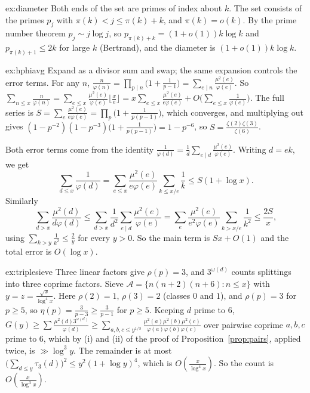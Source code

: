 \begin{solution}{ex:diameter}
\idea Both ends of the set are primes of index about $k$.
\writeup The set consists of the primes $p_{j}$ with $\pi(k)<j\le\pi(k)+k$, and $\pi(k)=o(k)$. By the prime number theorem $p_j\sim j\log j$, so
$p_{\pi(k)+k}=(1+o(1))k\log k$ and $p_{\pi(k)+1}\le2k$ for large $k$ (Bertrand), and the diameter is $(1+o(1))k\log k$.
\end{solution}

\begin{solution}{ex:hphiavg}
\idea Expand as a divisor sum and swap; the same expansion controls the error terms.
\writeup For any $n$, $\frac n{\varphi(n)}=\prod_{p\mid n}\bigl(1+\frac1{p-1}\bigr)=\sum_{e\mid n}\frac{\mu^2(e)}{\varphi(e)}$. So
$\sum_{n\le x}\frac n{\varphi(n)}=\sum_{e\le x}\frac{\mu^2(e)}{\varphi(e)}\lfloor\frac xe\rfloor=x\sum_{e\le x}\frac{\mu^2(e)}{e\varphi(e)}+O\bigl(\sum_{e\le x}\frac1{\varphi(e)}\bigr)$.
The full series is $S=\sum_e\frac{\mu^2(e)}{e\varphi(e)}=\prod_p\bigl(1+\frac1{p(p-1)}\bigr)$, which converges, and multiplying out gives
$(1-p^{-2})(1-p^{-3})\bigl(1+\frac1{p(p-1)}\bigr)=1-p^{-6}$, so $S=\frac{\zeta(2)\zeta(3)}{\zeta(6)}$.

Both error terms come from the identity $\frac1{\varphi(d)}=\frac1d\sum_{e\mid d}\frac{\mu^2(e)}{\varphi(e)}$. Writing $d=ek$, we get
\[
\sum_{d\le x}\frac1{\varphi(d)}=\sum_{e\le x}\frac{\mu^2(e)}{e\varphi(e)}\sum_{k\le x/e}\frac1k\le S(1+\log x).
\]
Similarly
\[
\sum_{d>x}\frac{\mu^2(d)}{d\varphi(d)}\le\sum_{d>x}\frac1{d^2}\sum_{e\mid d}\frac{\mu^2(e)}{\varphi(e)}=\sum_e\frac{\mu^2(e)}{e^2\varphi(e)}\sum_{k>x/e}\frac1{k^2}\le\frac{2S}x,
\]
using $\sum_{k>y}\frac1{k^2}\le\frac2y$ for every $y>0$. So the main term is $Sx+O(1)$ and the total error is $O(\log x)$.
\end{solution}

\begin{solution}{ex:triplesieve}
\idea Three linear factors give $\rho(p)=3$, and $3^{\omega(d)}$ counts splittings into three coprime factors.
\writeup Sieve $\mathcal A=\{n(n+2)(n+6):n\le x\}$ with $y=z=\frac{\sqrt x}{\log^4x}$. Here $\rho(2)=1$, $\rho(3)=2$ (classes $0$ and $1$), and $\rho(p)=3$ for
$p\ge5$, so $\eta(p)=\frac3{p-3}\ge\frac3{p-1}$ for $p\ge5$. Keeping $d$ prime to $6$, $G(y)\ge\sum\frac{\mu^2(d)3^{\omega(d)}}{\varphi(d)}\ge\sum_{a,b,c\le y^{1/3}}\frac{\mu^2(a)\mu^2(b)\mu^2(c)}{\varphi(a)\varphi(b)\varphi(c)}$
over pairwise coprime $a,b,c$ prime to $6$, which by (i) and (ii) of the proof of Proposition~\ref{prop:pairs}, applied twice, is $\gg\log^3y$. The
remainder is at most $\bigl(\sum_{d\le y}\tau_3(d)\bigr)^2\le y^2(1+\log y)^4$, which is $O(\frac x{\log^4x})$. So the count is $O(\frac x{\log^3x})$.
\end{solution}

